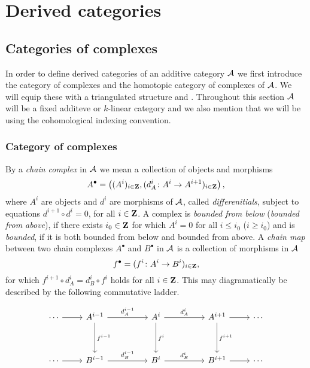 \section{Derived categories}

\subsection{Categories of complexes}
In order to define derived categories of an additive category $\mathcal A$ we first introduce the category of complexes and the homotopic category of complexes of $\mathcal A$. We will equip these with a triangulated structure and . Throughout this section $\mathcal A$ will be a fixed additeve or $k$-linear category and we also mention that we will be using the cohomological indexing convention.

\subsubsection*{{Category of complexes}}

By a \emph{chain complex} in $\mathcal A$ we mean a collection of objects and morphisms 
\[
    A^\bullet = \left((A^i)_{i \in \mathbf Z}, (d^i_A\colon A^i \to A^{i+1})_{i \in \mathbf Z}\right),
\] 
where $A^i$ are objects and $d^i$ are morphisms of $\mathcal A$, called \emph{differenitials}, subject to equations $d^{i+1}\circ d^i = 0$, for all $i \in \mathbf Z$. A complex is \emph{bounded from below} (\resp \emph{bounded from above}), if there exists $i_0 \in \mathbf Z$ for which $A^i = 0$ for all $i \leq i_0$ (\resp $i \geq i_0$) and is \emph{bounded}, if it is both bounded from below and bounded from above. A \emph{chain map} between two chain complexes $A^\bullet$ and $B^\bullet$ in $\mathcal A$ is a collection of morphisms in $\mathcal A$
\[
    f^\bullet = (f^i\colon A^i \to B^i)_{i \in \mathbf Z},
\]
for which $f^{i+1}\circ d^i_A = d^i_B \circ f^i$ holds for all $i \in \mathbf Z$. This may diagramatically be described by the following commutative ladder.

\[
\begin{tikzcd}
	\cdots & {A^{i-1}} && {A^i} && {A^{i+1}} & \cdots \\
	\\
	\cdots & {B^{i-1}} && {B^i} && {B^{i+1}} & \cdots
	\arrow[from=1-1, to=1-2]
	\arrow["{d^{i-1}_A}", from=1-2, to=1-4]
	\arrow["{f^{i-1}}", from=1-2, to=3-2]
	\arrow["{d^i_A}", from=1-4, to=1-6]
	\arrow["{f^i}", from=1-4, to=3-4]
	\arrow[from=1-6, to=1-7]
	\arrow["{f^{i+1}}", from=1-6, to=3-6]
	\arrow[from=3-1, to=3-2]
	\arrow["{d^{i-1}_B}", from=3-2, to=3-4]
	\arrow["{d^{i}_B}", from=3-4, to=3-6]
	\arrow[from=3-6, to=3-7]
\end{tikzcd}
\]

